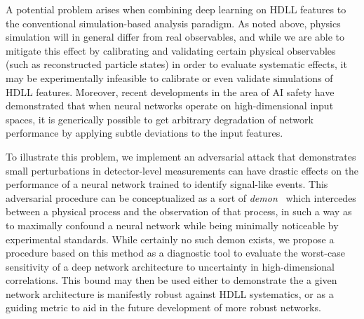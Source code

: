 \documentclass[reprint,nofootinbib,...]{revtex4-1}
\begin{document}

A potential problem arises when combining deep learning on HDLL features to the conventional simulation-based analysis paradigm.
As noted above, physics simulation will in general differ from real observables, and while we are able to mitigate this effect by calibrating and validating certain physical observables (such as reconstructed particle states) in order to evaluate systematic effects, it may be experimentally infeasible to calibrate or even validate simulations of HDLL features.
Moreover, recent developments in the area of AI safety have demonstrated that when neural networks operate on high-dimensional input spaces, it is generically possible to get arbitrary degradation of network performance by applying subtle deviations to the input features.



To illustrate this problem, we implement an adversarial attack that demonstrates small perturbations in detector-level measurements can have drastic effects on the performance of a neural network trained to identify signal-like events.
This adversarial procedure can be conceptualized as a sort of \textit{demon}~\cite{TheLordKelvin} which intercedes between a physical process and the observation of that process, in such a way as to maximally confound a neural network while being minimally noticeable by experimental standards.
While certainly no such demon exists, we propose a procedure based on this method as a diagnostic tool to evaluate the worst-case sensitivity of a deep network architecture to uncertainty in high-dimensional correlations.
This bound may then be used either to demonstrate the a given network architecture is manifestly robust against HDLL systematics, or as a guiding metric to aid in the future development of more robust networks.
\end{document}
